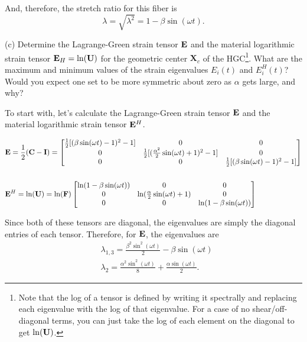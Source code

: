 And, therefore, the stretch ratio for this fiber is
\begin{equation*}
    \lambda = \sqrt{\lambda^2} = 1 - \beta \sin(\omega t).
\end{equation*}

\medskip
(c) Determine the Lagrange-Green strain tensor $\mathbf{E}$ and the material logarithmic strain tensor $\mathbf{E}_H = \ln (\mathbf{U})$ for the geometric center $\bm{X}_c$ of the HGC\footnote{Note that the log of a tensor is defined by writing it spectrally and replacing each eigenvalue with the log of that eigenvalue. For a case of no shear/off-diagonal terms, you can just take the log of each element on the diagonal to get $\ln(\mathbf{U})$.}. 
What are the maximum and minimum values of the strain eigenvalues $E_i(t)$ and $E_i^H(t)$? 
Would you expect one set to be more symmetric about zero as $\alpha$ gets large, and why?

To start with, let's calculate the Lagrange-Green strain tensor $\mathbf{E}$ and the material logarithmic strain tensor $\mathbf{E}^H$.

\begin{align*}
&\mathbf{E} = \frac{1}{2} (\mathbf{C} - \mathbf{I}) =
\begin{bmatrix}
\frac{1}{2}[(\beta\sin(\omega t) - 1)^2 - 1] & 0 & 0\\
0 & \frac{1}{2}[(\frac{\alpha^2}{2} \sin (\omega t) + 1)^2 -1] & 0\\
0 & 0 & \frac{1}{2}[(\beta\sin(\omega t) - 1)^2 - 1]
\end{bmatrix}\\
\\
&\mathbf{E}^H = \ln(\mathbf{U}) = \ln(\mathbf{F})
\begin{bmatrix}
\ln (1- \beta \sin (\omega t)) & 0 & 0\\
0 & \ln (\frac{\alpha}{2} \sin (\omega t) +1) & 0\\
0 & 0 & \ln(1- \beta \sin (\omega t))
\end{bmatrix}
\end{align*}

Since both of these tensors are diagonal, the eigenvalues are simply the diagonal entries of each tensor. Therefore, for $\mathbf{E}$, the eigenvalues are
\begin{align*}
    &\lambda_{1,3} = \frac{\beta^2 \sin^2 (\omega t)}{2} - \beta \sin (\omega t)\\
    &\lambda_2 = \frac{\alpha^2 \sin^2(\omega t)}{8} + \frac{\alpha \sin (\omega t)}{2}.
\end{align*}

